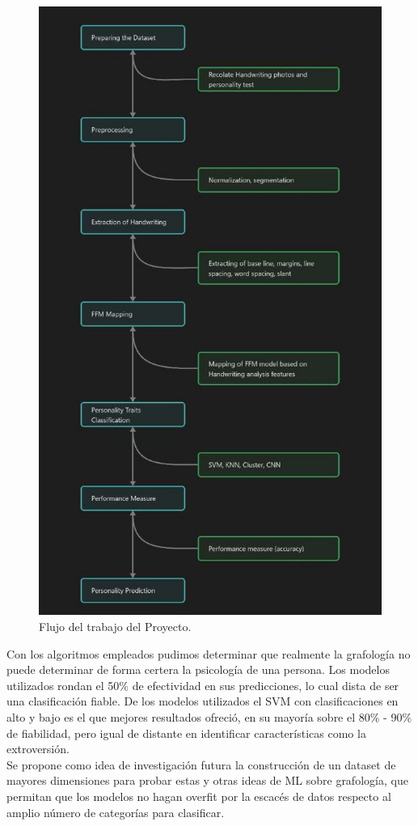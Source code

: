 \documentclass[10pt, a4paper]{article}
\begin{document}
        \begin{figure}[!h]
            \centering
            \includegraphics[width = 0.5\linewidth]{photo_2023-05-29_02-40-00.jpg}
            \caption{Flujo del trabajo del Proyecto.}
        \end{figure}

        Con los algoritmos empleados pudimos determinar que realmente la grafolog\'ia no puede determinar de 
        forma certera la psicolog\'ia de una persona. Los modelos utilizados rondan el 50\% de efectividad en sus predicciones, 
        lo cual dista de ser una clasificaci\'on fiable. De los modelos utilizados el SVM con clasificaciones en alto y bajo es el que mejores 
        resultados ofreci\'o, en su mayor\'ia sobre el 80\% - 90\% de fiabilidad, pero igual de distante en identificar caracter\'isticas como la extroversi\'on.\\ 

        Se propone como idea de investigaci\'on futura la construcci\'on de un dataset de mayores dimensiones para probar estas y otras ideas de ML sobre grafolog\'ia, que 
        permitan que los modelos no hagan overfit por la escac\'es de datos respecto al amplio n\'umero de categor\'ias para clasificar. 


        
        



    
\end{document}
